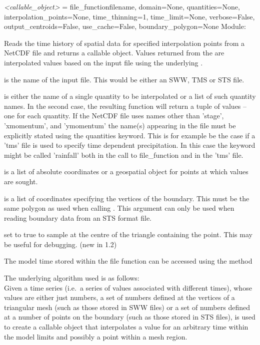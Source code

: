 \documentclass{manual}
\begin{document}
\begin{funcdesc}{\emph{<callable_object>} = file_function}{filename,
                                domain=None,
                                quantities=None,
                                interpolation_points=None,
                                time_thinning=1,
                                time_limit=None,
                                verbose=False,
                                output_centroids=False,
                                use_cache=False,
                                boundary_polygon=None}
Module: 

Reads the time history of spatial data for specified interpolation points from
a NetCDF file and returns a callable object.  Values returned from the 
are interpolated values based on the input file using the underlying .

 is the name of the input file.  
This would be either an SWW, TMS or STS file.

 is either the name of a single quantity to be
interpolated or a list of such quantity names. In the second case, the resulting
function will return a tuple of values -- one for each quantity.
If the NetCDF file uses names other than 'stage', 'xmomentum', and 'ymomentum'
the name(s) appearing in the file must be explicitly stated using the 
quantities keyword. This is for example be the case if a 'tms' file is used 
to specify time dependent precipitation. In this case the keyword might be called 'rainfall' both in the call to file\_function and in the 'tms' file.

 is a list of absolute coordinates or a
geospatial object for points at which values are sought.

 is a list of coordinates specifying the vertices of the boundary.
This must be the same polygon as used when calling .
This argument can only be used when reading boundary data from an STS format file.

 set to true to sample at the centre of the triangle containing the point.
This may be useful for debugging. (new in 1.2)

The model time stored within the file function can be accessed using
the method 

The underlying algorithm used is as follows:\\
Given a time series (i.e.\ a series of values associated with
different times), whose values are either just numbers, a set of
numbers defined at the vertices of a triangular mesh (such as those
stored in SWW files) or a set of
numbers defined at a number of points on the boundary (such as those
stored in STS files),  is used to
create a callable object that interpolates a value for an arbitrary
time  within the model limits and possibly a point 
within a mesh region.


\end{funcdesc}
\end{document}
